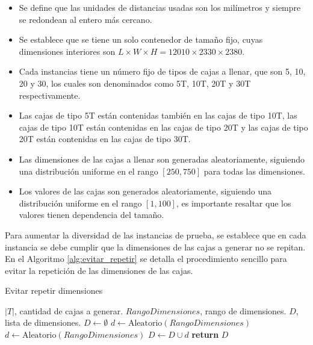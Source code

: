 \begin{itemize}
    \item Se define que las unidades de distancias usadas son los milímetros y siempre se redondean al entero más cercano.
    \item Se establece que se tiene un solo contenedor de tamaño fijo, cuyas dimensiones interiores son $L \times W \times H = 12010 \times 2330 \times 2380$.
    \item Cada instancias tiene un número fijo de tipos de cajas a llenar, que son 5, 10, 20 y 30, los cuales son denominados como 5T, 10T, 20T y 30T respectivamente.
    \item Las cajas de tipo 5T están contenidas también en las cajas de tipo 10T, las cajas de tipo 10T están contenidas en las cajas de tipo 20T y las cajas de tipo 20T están contenidas en las cajas de tipo 30T.
    \item Las dimensiones de las cajas a llenar son generadas aleatoriamente, siguiendo una distribución uniforme en el rango $[250, 750]$ para todas las dimensiones.
    \item Los valores de las cajas son generados aleatoriamente, siguiendo una distribución uniforme en el rango $[1, 100]$, es importante resaltar que los valores tienen dependencia del tamaño.
\end{itemize}

Para aumentar la diversidad de las instancias de prueba, se establece que en cada instancia se debe cumplir que la dimensiones de las cajas a generar no se repitan. En el Algoritmo \ref{alg:evitar_repetir} se detalla el procedimiento sencillo para evitar la repetición de las dimensiones de las cajas.

\begin{algorithm}[H]
    \caption{Evitar repetir dimensiones}
    \label{alg:evitar_repetir}
    \begin{algorithmic}[1]
        \Require $|T|$, cantidad de cajas a generar.
        \Require $RangoDimensiones$, rango de dimensiones.
        \Ensure $D$, lista de dimensiones.
        \State $D \gets \emptyset$
        \State $d \gets \text{Aleatorio}(RangoDimensiones)$
        \State $d \gets \text{Aleatorio}(RangoDimensiones)$
        \EndWhile
        \State $D \gets D \cup d$
        \EndFor
        \State \textbf{return} $D$
    \end{algorithmic}
\end{algorithm}

